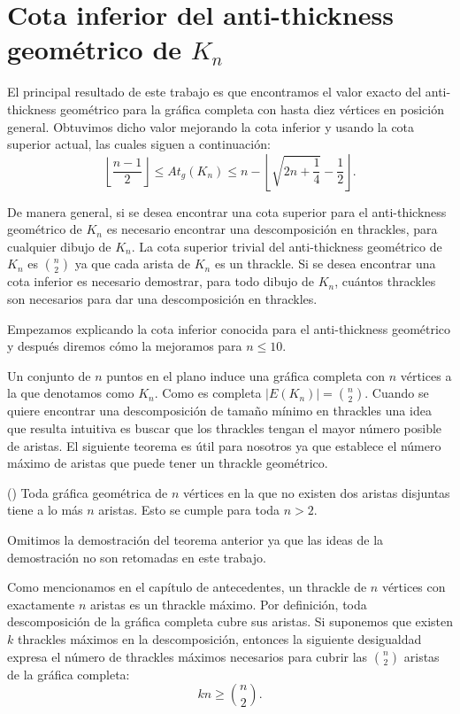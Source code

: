 \section{Cota inferior del anti-thickness geométrico de $K_n$}\label{sec:cota_inf}
El principal resultado de este trabajo es que encontramos el valor exacto del
anti-thickness geométrico para la gráfica completa con hasta diez vértices en
posición general. Obtuvimos dicho valor mejorando la cota inferior y usando la cota superior actual, las cuales siguen a continuación:
\begin{equation}
\left\lfloor\frac{n-1}{2}\right\rfloor \leq At_g(K_n) \leq n - \left\lfloor
\sqrt{2n + \frac{1}{4}} - \frac{1}{2} \right\rfloor.
\label{ecuacion_cotas_atg}
\end{equation}

De manera general, si se desea encontrar una cota superior para el
anti-thickness geométrico de $K_n$ es necesario encontrar una descomposición en
thrackles, para cualquier dibujo de $K_n$. La cota superior trivial del
anti-thickness geométrico de $K_n$ es $\binom{n}{2}$ ya que cada arista de
$K_n$ es un thrackle. Si se desea encontrar una cota inferior es necesario
demostrar, para todo dibujo de $K_n$, cuántos thrackles son necesarios para dar
una descomposición en thrackles.

Empezamos explicando la cota inferior conocida para el anti-thickness
geométrico y después diremos cómo la mejoramos para $n\leq 10$.

Un conjunto de $n$ puntos en el plano induce una gráfica completa con $n$
vértices a la que denotamos como $K_n$. Como es completa $|E(K_n)|=
\binom{n}{2}$.
Cuando se quiere encontrar una descomposición de tamaño mínimo en thrackles una
idea que resulta intuitiva es buscar que los thrackles tengan el mayor número
posible de aristas. El siguiente teorema es útil para nosotros ya que establece
el número máximo de aristas que puede tener un thrackle geométrico.
\begin{theorem}(\cite{Pach2013b})
  Toda gráfica geométrica de $n$ vértices en la
  que no existen dos aristas disjuntas tiene a lo más $n$ aristas. Esto se
  cumple para toda $n>2$.
\end{theorem}

Omitimos la demostración del teorema anterior ya que las ideas de la
demostración no son retomadas en este trabajo.

Como mencionamos en el capítulo de antecedentes, un thrackle de $n$ vértices
con exactamente $n$ aristas es un thrackle máximo. Por definición, toda
descomposición de la gráfica completa cubre sus aristas. Si suponemos que
existen $k$ thrackles máximos en la descomposición, entonces la siguiente
desigualdad expresa el número de thrackles máximos necesarios para cubrir las
$\binom{n}{2}$ aristas de la gráfica completa:
\[ kn \geq \binom{n}{2}. \]

